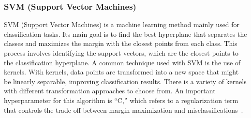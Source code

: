 \subsubsection{SVM (Support Vector Machines)}

SVM (Support Vector Machines) is a machine learning method mainly used for classification tasks. Its main goal is to find the best hyperplane that separates the classes and maximizes the margin with the closest points from each class. This process involves identifying the support vectors, which are the closest points to the classification hyperplane. A common technique used with SVM is the use of kernels. With kernels, data points are transformed into a new space that might be linearly separable, improving classification results. There is a variety of kernels with different transformation approaches to choose from. An important hyperparameter for this algorithm is “C,” which refers to a regularization term that controls the trade-off between margin maximization and misclassifications~\cite{geeksforgeeks_svm}.
